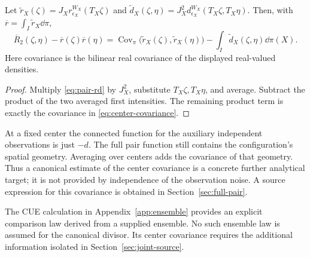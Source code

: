 \begin{proposition}\label{prop:covariance}
Let $\widetilde r_X(\zeta)=J_Xr_{\epsilon_X}^{W_X}(T_X\zeta)$ and
$\widetilde d_X(\zeta,\eta)=J_X^2d_{\epsilon_X}^{W_X}(T_X\zeta,T_X\eta)$.
Then, with $\overline r=\int_I\widetilde r_X\dd\pi$,
\begin{equation}\label{eq:center-covariance}
 \overline R_2(\zeta,\eta)-\overline r(\zeta)\overline r(\eta)
 =\operatorname{Cov}_{\pi}\bigl(\widetilde r_X(\zeta),
                              \widetilde r_X(\eta)\bigr)
       -\int_I\widetilde d_X(\zeta,\eta)\dd\pi(X).
\end{equation}
Here covariance is the bilinear real covariance of the displayed
real-valued densities.
\end{proposition}
\begin{proof}
Multiply \eqref{eq:pair-rd} by $J_X^2$, substitute $T_X\zeta,T_X\eta$,
and average. Subtract the product of the two averaged first intensities.
The remaining product term is exactly the covariance in
\eqref{eq:center-covariance}.
\end{proof}

At a fixed center the connected function for the auxiliary independent
observations is just $-d$. The full pair function still contains the
configuration's spatial geometry. Averaging over centers adds the
covariance of that geometry. Thus a canonical estimate of the
center covariance is a concrete further analytical target; it is not
provided by independence of the observation noise. A source expression
for this covariance is obtained in Section~\ref{sec:full-pair}.

The CUE calculation in Appendix~\ref{app:ensemble} provides an explicit
comparison law derived from a supplied ensemble. No such ensemble law
is assumed for the canonical divisor. Its center covariance requires
the additional information isolated in Section~\ref{sec:joint-source}.
